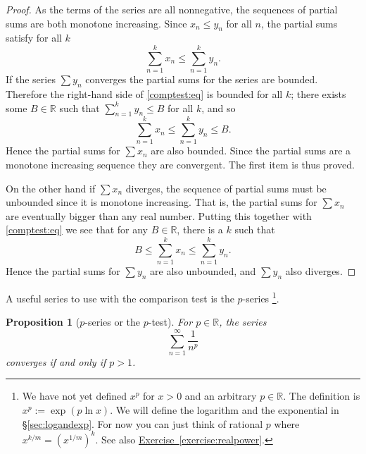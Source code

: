 \documentclass[12pt]{book}
\newcommand{\R}{{\mathbb{R}}}
\theoremstyle{plain}
\newtheorem{prop}[thm]{Proposition}
\theoremstyle{remark}
\theoremstyle{definition}
\theoremstyle{exercise}
\theoremstyle{example}
\newcommand{\sectionref}[1]{\hyperref[#1]{\S\ref*{#1}}}
\newcommand{\exerciseref}[1]{\hyperref[#1]{Exercise~\ref*{#1}}}
\begin{document}
\begin{proof}
As the terms of the series are all nonnegative, the sequences of
partial sums are both monotone increasing.
Since $x_n \leq y_n$ for all $n$, the partial sums
satisfy for all $k$
\begin{equation} \label{comptest:eq}
\sum_{n=1}^k x_n \leq \sum_{n=1}^k y_n .
\end{equation}
If the series $\sum y_n$ converges the partial sums for the series
are bounded.  Therefore the right-hand side of \eqref{comptest:eq}
is bounded for all $k$; there exists some $B \in \R$ such that
$\sum_{n=1}^k y_n \leq B$ for all $k$, and so
\begin{equation*}
\sum_{n=1}^k x_n \leq \sum_{n=1}^k y_n \leq B.
\end{equation*}
Hence the partial sums for $\sum x_n$
are also bounded.  Since the partial sums are a monotone increasing sequence
they are convergent.  The first item is thus proved.

On the other hand if $\sum x_n$ diverges, the sequence of partial sums
must be unbounded since it is monotone increasing.  That is, the partial
sums for $\sum x_n$ are eventually bigger than any real number.  Putting this
together with \eqref{comptest:eq} we see that for any $B \in
\R$, there is a $k$ such that 
\begin{equation*}
B \leq \sum_{n=1}^k x_n \leq \sum_{n=1}^k y_n .
\end{equation*}
Hence the partial sums for $\sum y_n$ are also unbounded, and $\sum
y_n$ also diverges.
\end{proof}

A useful series to use with the comparison test is the
$p$-series%
\footnote{We have not yet defined $x^p$ for $x > 0$ and
an arbitrary $p \in \R$.  The definition is $x^p := \exp ( p \ln x )$.
We will define the logarithm and the exponential in \sectionref{sec:logandexp}.
For now you can just think of rational $p$
where $x^{k/m} = {(x^{1/m})}^{k}$.  See also \exerciseref{exercise:realpower}.}.

\begin{prop}[$p$-series or the $p$-test]
For $p \in \R$, 
the series
\begin{equation*}
\sum_{n=1}^\infty \frac{1}{n^p}
\end{equation*}
converges if and only if $p > 1$.
\end{prop}
\end{document}
